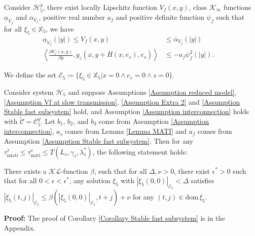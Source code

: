 \begin{assum}
    Consider $\mathcal{H}_5^y$, there exist locally Lipschitz function $V_f(x,y)$, class $\mathcal{K}_\infty$ functions $\underline{\alpha}_{V_f}$ and $\overline{\alpha}_{V_f}$, positive real number $a_f$ and positive definite function $\psi_f$ such that for all $\xi_5 \in \mathbb{X}_5$, we have
    \begin{align}
    \underline{\alpha}_{V_f}\left(\left| y \right|\right)\leq {V_f}(x,y) & \leq \overline{\alpha}_{V_f}\left(\left| y\right|\right) \\
     \left< \tfrac{\partial {V_f}(x,y)}{\partial y},g_z(x,y+ \overline{H}(x, e_s),e_s)  \right> &\leq -a_f \psi_f^2 \left(| y |\right).
     \label{eqn: Assumption stable fast subsystem, Uf flow}
    \end{align}
    \label{Assumption Stable fast subsystem}
\end{assum}
We define the set $\mathcal{E}_5 \coloneqq \{\xi_5 \in \mathbb{X}_5 | x=0 \wedge e_s = 0 \wedge z=0 \}$.
\begin{cor}
    Consider system $\mathcal{H}_5$ and suppose Assumptions \ref{Assumption reduced model}, \ref{Assumption Vf at slow transmission}, \ref{Assumption Extra 2} and \ref{Assumption Stable fast subsystem} hold, and Assumption \ref{Assumption interconnection} holds with $\widetilde{\mathcal{C}} =  \mathcal{C}_5^y$.
    Let $b_1$, $b_2$, and $b_3$ come from Assumption \ref{Assumption interconnection}, $a_s$ comes from Lemma \ref{Lemma MATI} and $a_f$ comes from Assumption \ref{Assumption Stable fast subsystem}. Then for any $\tau_{\text{miati}}^s \leq \tau_{\text{mati}}^s \leq T(L_s, \gamma_s, \lambda_s^*)$, the following statement holds:

    There exists a $\mathcal{KL}$-function $\beta$, such that for all $\Delta, \nu>0$, there exist $\epsilon^* >0$ such that for all $0<\epsilon<\epsilon^*$, any solution $\xi_5$ with $ |\xi_5(0,0)|_{\mathcal{E}_5}<\Delta$ satisfies $|\xi_5(t,j)|_{\mathcal{E}_5} \leq \beta(|\xi_5(0,0)|_{\mathcal{E}_5}, t+j) + \nu$ for any $(t,j)\in \text{dom} \, \xi_5$.
    \label{Corollary Stable fast subsystem}
\end{cor}
\textbf{Proof:} The proof of Corollary \ref{Corollary Stable fast subsystem} is in the Appendix. 


















